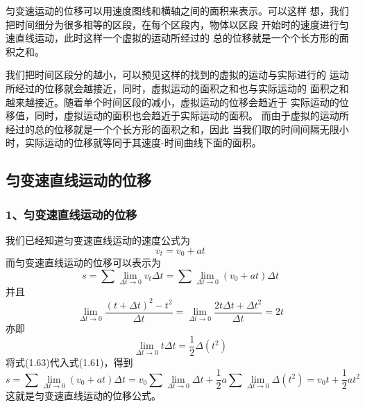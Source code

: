 匀变速运动的位移可以用速度图线和横轴之间的面积来表示。可以这样
想，我们把时间细分为很多相等的区段，在每个区段内，物体以区段
开始时的速度进行匀速直线运动，此时这样一个虚拟的运动所经过的
总的位移就是一个个长方形的面积之和。

我们把时间区段分的越小，可以预见这样的找到的虚拟的运动与实际进行的
运动所经过的位移就会越接近，同时，虚拟运动的面积之和也与实际运动的
面积之和越来越接近。随着单个时间区段的减小，虚拟运动的位移会趋近于
实际运动的位移值，同时，虚拟运动的面积也会趋近于实际运动的面积。
而由于虚拟的运动所经过的总的位移就是一个个长方形的面积之和，因此
当我们取的时间间隔无限小时，实际运动的位移就等同于其速度-时间曲线下面的面积。
\subsection{匀变速直线运动的位移}
\subsubsection*{1、匀变速直线运动的位移}
我们已经知道匀变速直线运动的速度公式为
\begin{equation}
    v_t=v_0+at
\end{equation}
而匀变速直线运动的位移可以表示为
\begin{equation}
    s=\sum\lim\limits_{\Delta t\to 0}v_t\Delta t=
    \sum\lim\limits_{\Delta t\to 0}(v_0+at)\Delta t
\end{equation}
并且 
\begin{equation}
    \lim\limits_{\Delta t\to 0}\frac{(t+\Delta t)^2-t^2}{\Delta t}
    =\lim\limits_{\Delta t\to 0}\frac{2t\Delta t+\Delta t^2}{\Delta t}
    =2t
\end{equation}
亦即 
\begin{equation}
    \lim\limits_{\Delta t\to 0}t\Delta t=\frac{1}{2}\Delta (t^2)
\end{equation}
将式(1.63)代入式(1.61)，得到 
\begin{equation}
    s=\sum\lim\limits_{\Delta t\to 0}(v_0+at)\Delta t=
    v_0\sum\lim\limits_{\Delta t\to 0}\Delta t+
    \frac{1}{2}a\sum\lim\limits_{\Delta t\to 0}\Delta (t^2)
    =v_0t+\frac{1}{2}at^2
\end{equation}
这就是匀变速直线运动的位移公式。
